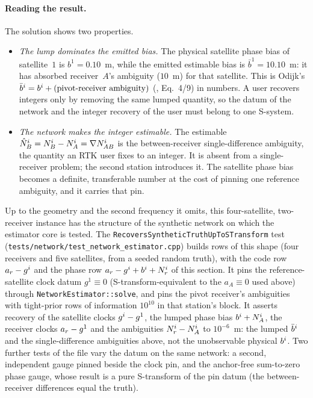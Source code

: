 \documentclass[main.tex]{subfiles}
\begin{document}
\paragraph{Reading the result.}
The solution shows two properties.
\begin{itemize}[leftmargin=*, itemsep=1pt]
\item \emph{The lump dominates the emitted bias.} The physical
      satellite phase bias of satellite~$1$ is $b^1 = 0.10$~m, while the
      emitted estimable bias is $\bar b^1 = 10.10$~m: it has absorbed
      receiver~$A$'s ambiguity ($10$~m) for that satellite. This is
      Odijk's $\bar b^i = b^i + (\text{pivot-receiver
      ambiguity})$ (,
      Eq.~4/9) in numbers. A user recovers integers only by removing
      the same lumped quantity, so the datum of the network and the
      integer recovery of the user must belong to one S-system.
\item \emph{The network makes the integer estimable.} The estimable
      $\hat N^i_B = N^i_B - N^i_A = \nabla N^i_{AB}$ is the
      between-receiver single-difference ambiguity, the quantity an RTK
      user fixes to an integer. It is absent from a single-receiver
      problem; the second station introduces it. The satellite phase
      bias becomes a definite, transferable number at the cost of
      pinning one reference ambiguity, and it carries that pin.
\end{itemize}

Up to the geometry and the second frequency it omits, this
four-satellite, two-receiver instance has the structure of the synthetic
network on which the estimator core is tested. The
\texttt{RecoversSyntheticTruthUpToSTransform} test
(\texttt{tests/network/test\_network\_estimator.cpp}) builds rows of this
shape (four receivers and five satellites, from a seeded random truth),
with the code row $a_r - g^i$ and the phase row
$a_r - g^i + b^i + N^i_r$ of this section. It pins the
reference-satellite clock datum $g^1 \equiv 0$ (S-transform-equivalent to
the $a_A \equiv 0$ used above) through \texttt{NetworkEstimator::solve},
and pins the pivot receiver's ambiguities with tight-prior rows of
information $10^{10}$ in that station's block. It asserts recovery of the
satellite clocks $g^i - g^1$, the lumped phase bias
$b^i + N^i_A$, the receiver clocks $a_r - g^1$ and the
ambiguities $N^i_r - N^i_A$ to $10^{-6}$~m: the lumped $\bar b^i$
and the single-difference ambiguities above, not the unobservable
physical $b^i$. Two further tests of the file vary the datum on the
same network: a second, independent gauge pinned beside the clock pin,
and the anchor-free sum-to-zero phase gauge, whose result is a pure
S-transform of the pin datum (the between-receiver differences equal the
truth).

\ifSubfilesClassLoaded{\printbibliography}{}
\end{document}
